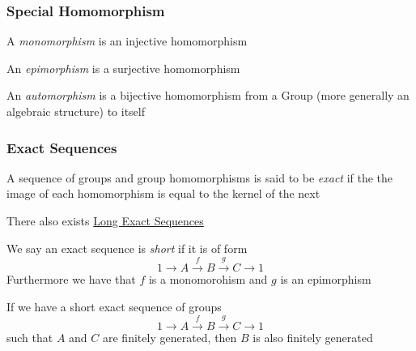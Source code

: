     \subsubsection{Special Homomorphism}
    \begin{definition}[Monomorphism]
        A \textit{monomorphism} is an injective homomorphism
    \end{definition}
    \begin{definition}[Epimorphism]
        An \textit{epimorphism} is a surjective homomorphism
    \end{definition}
    \begin{definition}[Automorphism]
        An \textit{automorphism} is a bijective homomorphism from a Group (more generally an algebraic structure) to itself
    \end{definition}
    \BBreak
    \subsubsection{Exact Sequences}
    \begin{definition}
        A sequence of groups and group homomorphisms is said to be \textit{exact} if the the image of each homomorphism is equal to the kernel of the next
    \end{definition}
    \begin{remark}
        There also exists \href{https://en.wikipedia.org/wiki/Exact_sequence#Long_exact_sequence}{Long Exact Sequences}
    \end{remark}
    We say an exact sequence is \textit{short} if it is of form
    \[1\to A\stackrel{f}{\to}B\stackrel{g}{\to} C\to 1\]
    Furthermore we have that $f$ is a monomorohism and $g$ is an epimorphism
    \BBreak
    \begin{lemma}
        If we have a short exact sequence of groups
        \[1\to A\stackrel{f}{\to}B\stackrel{g}{\to} C\to 1\]
        such that $A$ and $C$ are finitely generated, then $B$ is also finitely generated
    \end{lemma}
    \BBreak
